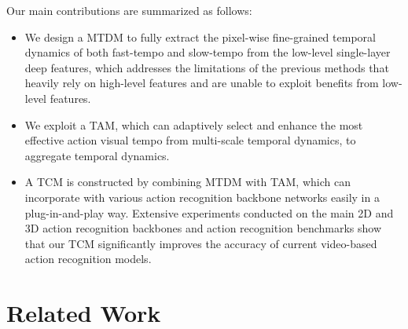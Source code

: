 \documentclass[journal]{IEEEtran}
\begin{document}
Our main contributions are summarized as follows:
\begin{itemize}
\item We design a MTDM to fully extract the pixel-wise fine-grained temporal dynamics of both fast-tempo and slow-tempo from the low-level single-layer deep features, which addresses the limitations of the previous methods that heavily rely on high-level features and are unable to exploit benefits from low-level features.
\item We exploit a TAM, which can adaptively select and enhance the most effective action visual tempo from multi-scale temporal dynamics, to aggregate temporal dynamics.
\item A TCM is constructed by combining MTDM with TAM, which can incorporate with various action recognition backbone networks easily in a plug-in-and-play way. Extensive experiments conducted on the main 2D and 3D action recognition backbones and action recognition benchmarks show that our TCM significantly improves the accuracy of current video-based action recognition models.
\end{itemize}


\section{Related Work}
\end{document}
